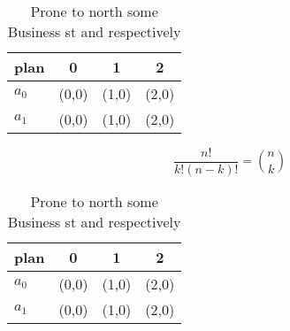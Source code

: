 \documentclass[a4paper]{article}
\begin{document}
\begin{table}
\begin{adjustbox}{width=0.6\columnwidth}
\begin{tabular}{|l|l|l|l|}
\hline
\textbf{plan} & \multicolumn{1}{c|}{\textbf{0}} & \multicolumn{1}{c|}{\textbf{1}} & \multicolumn{1}{c|}{\textbf{2}} \\ \hline
\textbf{$a_0$}  & (0,0) & (1,0) & (2,0) \\ \hline
\textbf{$a_1$}  & (0,0) & (1,0) & (2,0) \\ \hline
\end{tabular}
\end{adjustbox}
\caption{Prone to north some Business st and respectively 
}
\end{table}

\[ \frac{n!}{k!(n-k)!} = \binom{n}{k} \]

\begin{table}
\begin{adjustbox}{width=0.6\columnwidth}
\begin{tabular}{|l|l|l|l|}
\hline
\textbf{plan} & \multicolumn{1}{c|}{\textbf{0}} & \multicolumn{1}{c|}{\textbf{1}} & \multicolumn{1}{c|}{\textbf{2}} \\ \hline
\textbf{$a_0$}  & (0,0) & (1,0) & (2,0) \\ \hline
\textbf{$a_1$}  & (0,0) & (1,0) & (2,0) \\ \hline
\end{tabular}
\end{adjustbox}
\caption{Prone to north some Business st and respectively 
}
\end{table}
\end{document}
